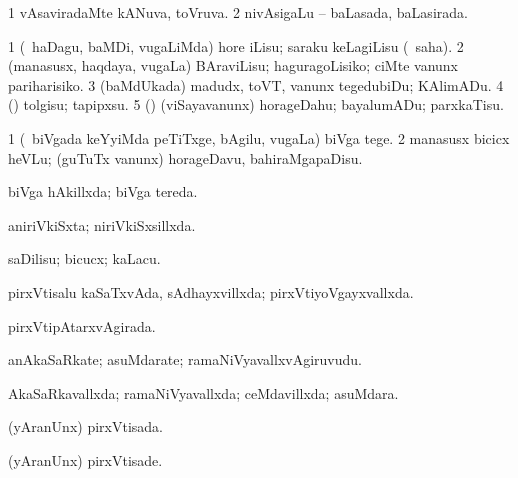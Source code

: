 {{\bentry
{} 
\gl{\gu}
\expl{}
\bmng
\bnum
\num{1} vAsaviradaMte kANuva, toVruva. 
\num{2} nivAsigaLu -- baLasada, baLasirada. 
\enum
\emng
\eentry

\bentry
{} 
\gl{\sakirx}
\expl{}
\bmng
\bnum
\num{1} (\kanmu\ haDagu, baMDi, \mo vugaLiMda) hore iLisu; saraku keLagiLisu (\akirx\ saha). 
\num{2} (manasusx, haqdaya, \mo vugaLa) BAraviLisu; haguragoLisiko; ciMte \mo vanunx pariharisiko. 
\num{3} (baMdUkada) madudx, toVT, \mo vanunx tegedubiDu; KAlimADu. 
\num{4} (\AmA) tolgisu; tapipxsu. 
\num{5} (\AmA) (viSayavanunx) horageDahu; bayalumADu; parxkaTisu. 
\enum
\emng
\eentry

\bentry
{} 
\gl{\sakirx}
\expl{}
\bmng
\bnum
\num{1} (\kanmu\ biVgada keYyiMda peTiTxge, bAgilu, \mo vugaLa) biVga tege. 
\num{2} manasusx bicicx heVLu; (guTuTx \mo vanunx) horageDavu, bahiraMgapaDisu. 
\enum
\emng
\eentry

\bentry
{} 
\gl{\gu}
\expl{}
\bmng
biVga hAkillxda; biVga tereda. 
\emng
\eentry

\bentry
{} 
\gl{\gu}
\expl{}
\bmng
aniriVkiSxta; niriVkiSxsillxda. 
\emng
\eentry

\bentry
{} 
\gl{\sakirx}
\expl{}
\bmng
saDilisu; bicucx; kaLacu. 
\emng
\eentry

\bentry
{} 
\gl{\sakirx}
\expl{}
\bmng
{} 
\emng
\eentry

\bentry
{} 
\gl{\gu}
\expl{}
\bmng
pirxVtisalu kaSaTxvAda, sAdhayxvillxda; pirxVtiyoVgayxvallxda. 
\emng
\eentry

\bentry
{} 
\gl{\gu}
\bmng
pirxVtipAtarxvAgirada. 
\emng
\eentry

\bentry
{} 
\gl{\nA}
\expl{}
\bmng
anAkaSaRkate; asuMdarate; ramaNiVyavallxvAgiruvudu. 
\emng
\eentry

\bentry
{} 
\gl{\gu}
\bmng
AkaSaRkavallxda; ramaNiVyavallxda; ceMdavillxda; asuMdara. 
\emng
\eentry

\bentry
{} 
\gl{\gu}
\bmng
(yAranUnx) pirxVtisada. 
\emng
\eentry

\bentry
{} 
\gl{\kirxvi}
\expl{}
\bmng
(yAranUnx) pirxVtisade. 
\emng
\eentry

}}
